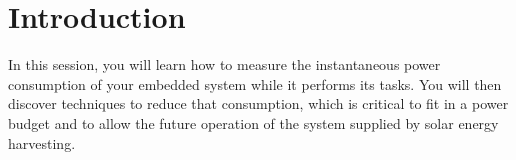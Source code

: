 \section*{Introduction}

In this session, you will learn how to measure the instantaneous power consumption of your embedded system while it performs its tasks. You will then discover techniques to reduce that consumption, which is critical to fit in a power budget and to allow the future operation of the system supplied by solar energy harvesting.
